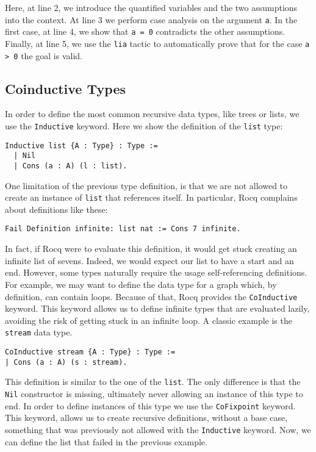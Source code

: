 Here, at line 2, we introduce the quantified variables and the two assumptions into the context. At line 3 we perform case analysis on the argument \texttt a. In the first case, at line 4, we show that \texttt{a = 0} contradicts the other assumptions. Finally, at line 5, we use the \texttt{lia} tactic to automatically prove that for the case \texttt{a > 0} the goal is valid.

\subsection{Coinductive Types}
\label{subsec:coind}

In order to define the most common recursive data types, like trees or lists, we use the \texttt{Inductive} keyword. Here we show the definition of the \texttt{list} type:

\begin{lstlisting}[style=Rocq]
Inductive list {A : Type} : Type :=
  | Nil
  | Cons (a : A) (l : list).
\end{lstlisting}

One limitation of the previous type definition, is that we are not allowed to create an instance of \texttt{list} that references itself. In particular, Rocq complains about definitions like these:

\begin{lstlisting}[style=Rocq]
Fail Definition infinite: list nat := Cons 7 infinite.
\end{lstlisting}

In fact, if Rocq were to evaluate this definition, it would get stuck creating an infinite list of sevens. Indeed, we would expect our list to have a start and an end.
However, some types naturally require the usage self-referencing definitions. For example, we may want to define the data type for a graph which, by definition, can contain loops. Because of that, Rocq provides the \texttt{CoInductive} keyword. This keyword allows us to define infinite types that are evaluated lazily, avoiding the risk of getting stuck in an infinite loop. A classic example is the \texttt{stream} data type.

\begin{lstlisting}[style=Rocq]
CoInductive stream {A : Type} : Type :=
| Cons (a : A) (s : stream).
\end{lstlisting}

This definition is similar to the one of the \texttt{list}. The only difference is that the \texttt{Nil} constructor is missing, ultimately never allowing an instance of this type to end. In order to define instances of this type we use the \texttt{CoFixpoint} keyword. This keyword, allows us to create recursive definitions, without a base case, something that was previously not allowed with the \texttt{Inductive} keyword. Now, we can define the list that failed in the previous example.

